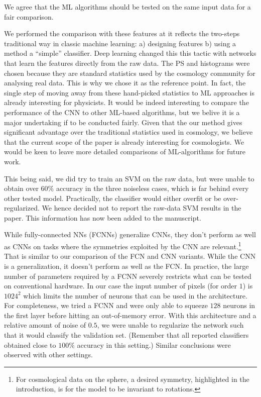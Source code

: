 \documentclass[12pt,a4paper]{article}
\newcommand{\nati}[1]{{\color[rgb]{.1,.6,.1}{NP: #1}}}
\newcommand{\1}{\b{1}}              %
\newcommand{\0}{\b{0}}              %
\begin{document}
We agree that the ML algorithms should be tested on the same input data for a fair comparison.

We performed the comparison with these features at it reflects the two-steps traditional way in classic machine learning: a) designing features b) using a method a ``simple'' classifier. Deep learning changed this this tactic with networks that learn the features directly from the raw data.
The PS and histograms were chosen because they are standard statistics used by the cosmology community for analysing real data.
This is why we chose it as the reference point.
In fact, the single step of moving away from these hand-picked statistics to ML approaches is already interesting for physicists.
It would be indeed interesting to compare the performance of the CNN to other ML-based algorithms, but we belive it is a major undertaking if to be conducted fairly.
Given that the our method gives significant advantage over the traditional statistics used in cosmology, we believe that the current scope of the paper is already interesting for cosmologists.
We would be keen to leave more detailed comparisons of ML-algorithms for future work.


This being said, we did try to train an SVM on the raw data, but were unable to obtain over $60\%$ accuracy in the three noiseless cases, which is far behind every other tested model.
Practically, the classifier would either overfit or be over-regularized.
We hence decided not to report the raw-data SVM results in the paper.
This information has now been added to the manuscript.

While fully-connected NNs (FCNNs) generalize CNNs, they don't perform as well as CNNs on tasks where the symmetries exploited by the CNN are relevant.\footnote{For cosmological data on the sphere, a desired symmetry, highlighted in the introduction, is for the model to be invariant to rotations.}
That is similar to our comparison of the FCN and CNN variants.
While the CNN is a generalization, it doesn't perform as well as the FCN.
In practice, the large number of parameters required by a FCNN severely restricts what can be tested on conventional hardware. In our case the input number of pixels (for order $1$) is $1024^2$ which limits the number of neurons that can be used in the architecture. For completeness, we tried a FCNN and were only able to squeeze $128$ neurons in the first layer before hitting an out-of-memory error. With this architecture and a relative amount of noise of $0.5$, we were unable to regularize the network such that it would classify the validation set. (Remember that all reported classifiers obtained close to $100\%$ accuracy in this setting.) Similar conclusions were observed with other settings.
\end{document}

